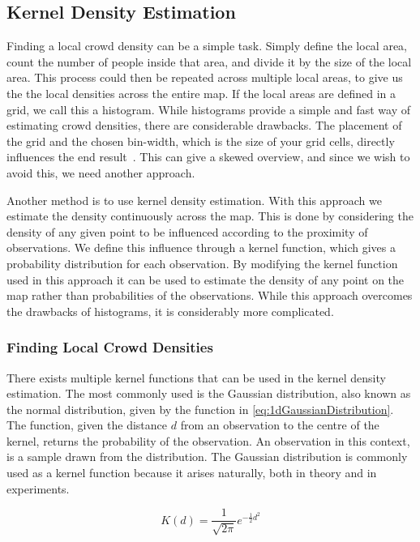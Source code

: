 \subsection{Kernel Density Estimation}
\label{sub:kernelDensityEstimation}

Finding a local crowd density can be a simple task. Simply define the local area, count the number of people inside that area, and divide it by the size of the local area. This process could then be repeated across multiple local areas, to give us the the local densities across the entire map. If the local areas are defined in a grid, we call this a histogram. While histograms provide a simple and fast way of estimating crowd densities, there are considerable drawbacks. The placement of the grid and the chosen bin-width, which is the size of your grid cells, directly influences the end result~\cite{histogramDrawbacks}. This can give a skewed overview, and since we wish to avoid this, we need another approach.

Another method is to use kernel density estimation. With this approach we estimate the density continuously across the map. This is done by considering the density of any given point to be influenced according to the proximity of observations. We define this influence through a kernel function, which gives a probability distribution for each observation. By modifying the kernel function used in this approach it can be used to estimate the density of any point on the map rather than probabilities of the observations. While this approach overcomes the drawbacks of histograms, it is considerably more complicated.

\subsubsection{Finding Local Crowd Densities}
There exists multiple kernel functions that can be used in the kernel density estimation. The most commonly used is the Gaussian distribution, also known as the normal distribution, given by the function in \cref{eq:1dGaussianDistribution}. The function, given the distance $d$ from an observation to the centre of the kernel, returns the probability of the observation. An observation in this context, is a sample drawn from the distribution. The Gaussian distribution is commonly used as a kernel function because it arises naturally, both in theory and in experiments.

\begin{equation}
\label{eq:1dGaussianDistribution}
K(d) = \frac{1}{\sqrt{2\pi}} e^{-\frac{1}{2} d^2}
\end{equation}

